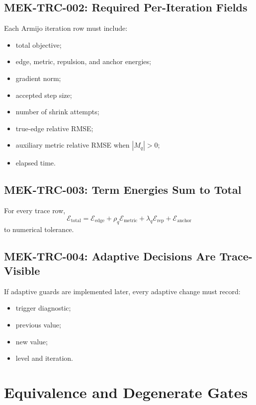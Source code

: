 \documentclass[11pt]{article}
\begin{document}
\subsection{MEK-TRC-002: Required Per-Iteration Fields}

Each Armijo iteration row must include:
\begin{itemize}[leftmargin=2em]
  \item total objective;
  \item edge, metric, repulsion, and anchor energies;
  \item gradient norm;
  \item accepted step size;
  \item number of shrink attempts;
  \item true-edge relative RMSE;
  \item auxiliary metric relative RMSE when \(|M_q|>0\);
  \item elapsed time.
\end{itemize}

\subsection{MEK-TRC-003: Term Energies Sum to Total}

For every trace row,
\[
  \mathcal{E}_{\mathrm{total}}
  =
  \mathcal{E}_{\mathrm{edge}}
  +
  \rho_q\mathcal{E}_{\mathrm{metric}}
  +
  \lambda_q\mathcal{E}_{\mathrm{rep}}
  +
  \mathcal{E}_{\mathrm{anchor}}
\]
to numerical tolerance.

\subsection{MEK-TRC-004: Adaptive Decisions Are Trace-Visible}

If adaptive guards are implemented later, every adaptive change must record:
\begin{itemize}[leftmargin=2em]
  \item trigger diagnostic;
  \item previous value;
  \item new value;
  \item level and iteration.
\end{itemize}

\section{Equivalence and Degenerate Gates}
\end{document}
